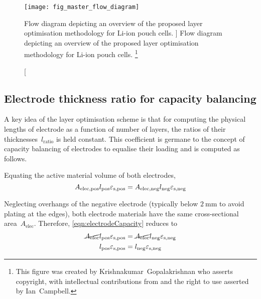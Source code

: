 

\begin{figure}[p]
    \begin{minipage}[t]{\textwidth}
        \centering
        \texttt{[image: fig\_master\_flow\_diagram]}
        \captionsetup{labelsep=note}
        \caption
        [%
        Flow diagram depicting an overview of the proposed layer optimisation methodology
        for Li-ion pouch cells.
        ]%
        {%
            Flow diagram depicting an overview of the proposed layer optimisation methodology
            for Li-ion pouch cells.
        }%
        \label{fig:fig_strategy_schematic}
        \mpfootnotes[1]
        \vspace*{0.7225cm}
        \footnote{This figure was created by \mbox{Krishnakumar Gopalakrishnan} who
            asserts copyright, with intellectual contributions from and the right to
        use asserted by \mbox{Ian Campbell}.}
    \end{minipage}
\end{figure}

\subsection{Electrode thickness ratio for capacity balancing}\label{sec:electroderatio}

A key  idea of the layer  optimisation scheme is that  for computing the
physical  lengths  of electrode  as  a  function  of number  of  layers,
the  ratios  of  their thicknesses~$l_\text{ratio}$  is  held  constant.
This  coefficient is  germane to  the concept  of capacity  balancing of
electrodes  to equalise  their loading and is computed as follows.

Equating  the active material volume of both electrodes,
\begin{equation}
    A_\text{elec,pos}l_\text{pos}  \varepsilon_\text{s,pos} = A_\text{elec,neg}l_\text{neg}  \varepsilon_\text{s,neg} \label{eqn:electrodeCapacity}\\
\end{equation}

Neglecting  overhangs   of  the  negative  electrode   (typically  below
$\SI{2}{\milli\meter}$ to  avoid plating  at the edges),  both electrode
materials have the same cross-sectional area~$A_\text{elec}$. Therefore,
\cref{eqn:electrodeCapacity} reduces to
\begin{align}
    \cancel{A_\text{elec}}l_\text{pos}  \varepsilon_\text{s,pos} & = \cancel{A_\text{elec}}l_\text{neg}  \varepsilon_\text{s,neg}  \\
    l_\text{pos}  \varepsilon_\text{s,pos}                       & = l_\text{neg}  \varepsilon_\text{s,neg}\label{eqn:electrodeCapequalarea}
\end{align}


